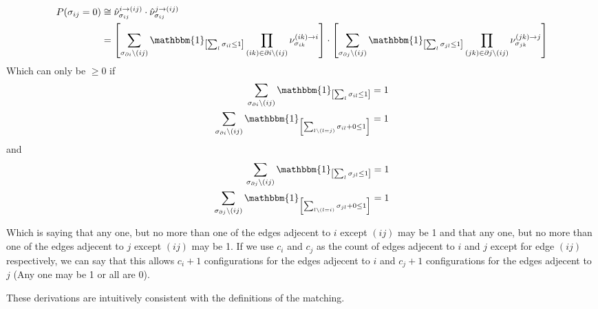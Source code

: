 \documentclass[a4paper]{scrartcl}
\begin{document}
\begin{align}
    P(\sigma_{ij} = 0) &\cong \hat{\nu}_{\sigma_{ij}}^{i \rightarrow (ij)} \cdot \hat{\nu}_{\sigma_{ij}}^{j \rightarrow (ij)} \\
    &= \left[ \sum_{\sigma_{\partial i} \backslash (ij)} \mathbbm{1}_{\left[\sum_l \sigma_{il} \leq 1 \right]} \prod_{(ik) \in \partial i \backslash (ij)} \nu_{\sigma_{ik}}^{(ik) \rightarrow i} \right]
     \cdot \left[ \sum_{\sigma_{\partial j} \backslash (ij)} \mathbbm{1}_{\left[\sum_l \sigma_{jl} \leq 1 \right]} \prod_{(jk) \in \partial j \backslash (ij)} \nu_{\sigma_{jk}}^{(jk) \rightarrow j} \right]
\end{align}
Which can only be $\geq 0$ if 
\begin{align}
    \sum_{\sigma_{\partial i} \backslash (ij)} \mathbbm{1}_{\left[\sum_l \sigma_{il} \leq 1 \right]} &= 1 \\
    \sum_{\sigma_{\partial i} \backslash (ij)} \mathbbm{1}_{\left[\sum_{l \backslash (l = j)} \sigma_{il} + 0 \leq 1 \right]} &= 1 \\
\end{align}
and 
\begin{align}
    \sum_{\sigma_{\partial j} \backslash (ij)} \mathbbm{1}_{\left[\sum_l \sigma_{jl} \leq 1 \right]} &= 1 \\
    \sum_{\sigma_{\partial j} \backslash (ij)} \mathbbm{1}_{\left[\sum_{l \backslash (l = i)} \sigma_{jl} + 0 \leq 1 \right]} &= 1
\end{align}

Which is saying that any one, but no more than one of the edges adjecent to $i$ except $(ij)$ may be 1 and that any one, but no more than one of the edges adjecent to $j$ except $(ij)$ may be 1. 
If we use $c_i$ and $c_j$ as the count of edges adjecent to $i$ and $j$ except for edge $(ij)$ respectively, we can say that this allows $c_i+1$ configurations for the edges adjecent to $i$ and $c_j + 1$ configurations for the edges adjecent to $j$ (Any one may be 1 or all are 0).

These derivations are intuitively consistent with the definitions of the matching.
\end{document}
